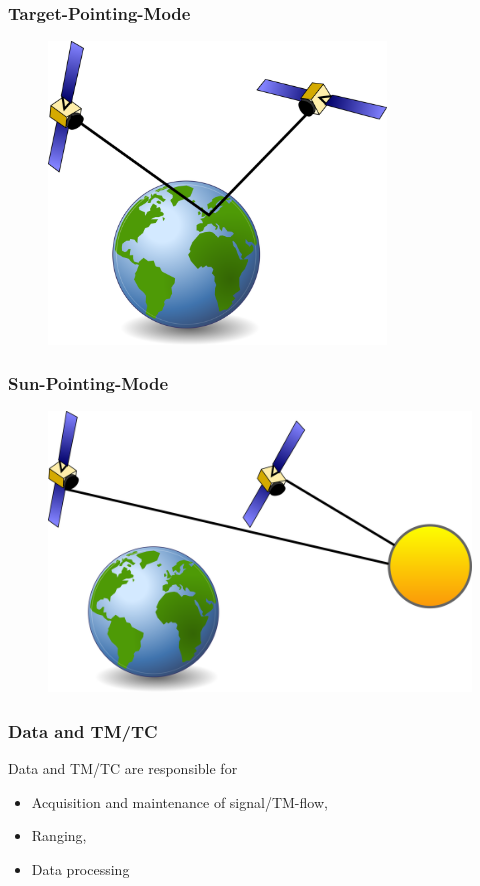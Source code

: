\documentclass[12pt,utf8,notheorems,compress]{beamer}
\begin{document}
\begin{frame}
  \frametitle{Target-Pointing-Mode}
  \pause
  \begin{figure}[!ht]
    \centering
    \includegraphics[width=0.8\textwidth]{target-pointing-mode.png}
  \end{figure}
\end{frame}

\begin{frame}
  \frametitle{Sun-Pointing-Mode}
  \begin{figure}[!ht]
    \centering
    \includegraphics[width=\textwidth]{sun-pointing-mode.png}
  \end{figure}
\end{frame}

\begin{frame}
  \frametitle{Data and TM/TC}
  \pause
  Data and TM/TC are responsible for
  \begin{itemize}
  \item Acquisition and maintenance of signal/TM-flow, \pause
  \item Ranging, \pause
  \item Data processing    
  \end{itemize}
\end{frame}
\end{document}
